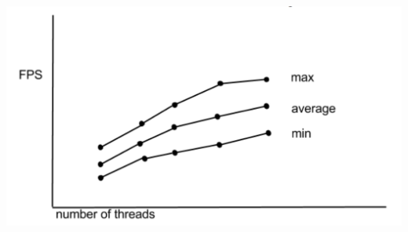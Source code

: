 \begin{DoxyImageNoCaption}
  \mbox{\includegraphics[width=\textwidth,height=\textheight/2,keepaspectratio=true]{FuncSpecOutputs.png}}
\end{DoxyImageNoCaption}
 